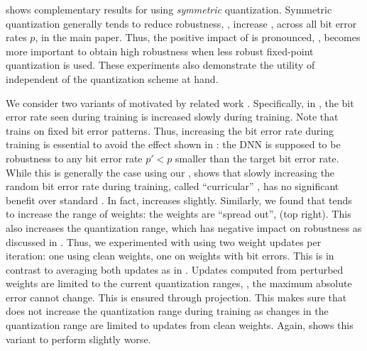  shows complementary results for \Random using \emph{symmetric} quantization. Symmetric quantization generally tends to reduce robustness, \ie, increase \RTE, across all bit error rates $p$, \cf {} in the main paper. Thus, the positive impact of \Random is pronounced, \ie, \Random becomes more important to obtain high robustness when less robust fixed-point quantization is used. These experiments also demonstrate the utility of \Random independent of the quantization scheme at hand. 

We consider two variants of \Random motivated by related work \cite{KoppulaMICRO2019}. Specifically, in \cite{KoppulaMICRO2019}, the bit error rate seen during training is increased slowly during training. Note that \cite{KoppulaMICRO2019} trains on fixed bit error patterns. Thus, increasing the bit error rate during training is essential to avoid the effect shown in : the DNN is supposed to be robustness to any bit error rate $p' < p$ smaller than the target bit error rate. While this is generally the case using our \Random,  shows that slowly increasing the random bit error rate during training, called ``curricular'' \Random, has no significant benefit over standard \Random. In fact, \RTE increases slightly. Similarly, we found that \Random tends to increase the range of weights: the weights are ``spread out'', \cf {} (top right). This also increases the quantization range, which has negative impact on robustness as discussed in . Thus, we experimented with \Random using two weight updates per iteration: one using clean weights, one on weights with bit errors. This is in contrast to averaging both updates as in . Updates computed from perturbed weights are limited to the current quantization ranges, \ie, the maximum absolute error cannot change. This is ensured through projection. This makes sure that \Random does not increase the quantization range during training as changes in the quantization range are limited to updates from clean weights. Again,  shows this variant to perform slightly worse.

